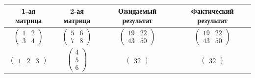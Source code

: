 \documentclass[a4paper, 12pt]{extreport}
\begin{document}
\begin{table}[h]
    \begin{center}
        \begin{threeparttable}
            \captionsetup{justification=raggedright,singlelinecheck=off}
            \begin{tabular}{|c|c|c|c|}
                \hline
                \textbf{1-ая матрица} & \textbf{2-ая матрица} & \textbf{Ожидаемый результат} & \textbf{Фактический результат} \\ \hline
                $\begin{pmatrix}
                    1 & 2 \\
                    3 & 4
                \end{pmatrix}$ & 
                $\begin{pmatrix}
                    5 & 6 \\
                    7 & 8
                \end{pmatrix}$ & 
                $\begin{pmatrix}
                    19 & 22 \\
                    43 & 50
                \end{pmatrix}$ & 
                $\begin{pmatrix}
                    19 & 22 \\
                    43 & 50
                \end{pmatrix}$ \\ \hline
                
                $\begin{pmatrix}
                    1 & 2 & 3
                \end{pmatrix}$ & 
                $\begin{pmatrix}
                    4 \\
                    5 \\
                    6
                \end{pmatrix}$ & 
                $\begin{pmatrix}
                    32
                \end{pmatrix}$ & 
                $\begin{pmatrix}
                    32
                \end{pmatrix}$ \\ \hline
                

\end{tabular}
\end{threeparttable}
\end{center}
\end{table}
\end{document}
